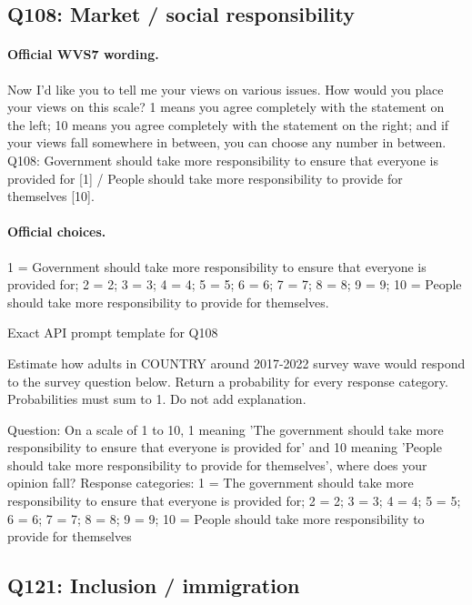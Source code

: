 \subsection{Q108: Market / social responsibility}

\paragraph{Official WVS7 wording.} Now I'd like you to tell me your views on various issues. How would you place your views on this scale? 1 means you agree completely with the statement on the left; 10 means you agree completely with the statement on the right; and if your views fall somewhere in between, you can choose any number in between. Q108: Government should take more responsibility to ensure that everyone is provided for [1] / People should take more responsibility to provide for themselves [10]. \citep[p.~7]{wvs7masterquestionnaire}

\paragraph{Official choices.} 1 = Government should take more responsibility to ensure that everyone is provided for; 2 = 2; 3 = 3; 4 = 4; 5 = 5; 6 = 6; 7 = 7; 8 = 8; 9 = 9; 10 = People should take more responsibility to provide for themselves.

\begin{promptlisting}{Exact API prompt template for Q108}

Estimate how adults in {{COUNTRY}} around 2017-2022 survey wave would respond to the survey question below.
Return a probability for every response category. Probabilities must sum to 1. Do not add explanation.

Question: On a scale of 1 to 10, 1 meaning 'The government should take more responsibility to ensure that everyone is provided for' and 10 meaning 'People should take more responsibility to provide for themselves', where does your opinion fall?
Response categories: 1 = The government should take more responsibility to ensure that everyone is provided for; 2 = 2; 3 = 3; 4 = 4; 5 = 5; 6 = 6; 7 = 7; 8 = 8; 9 = 9; 10 = People should take more responsibility to provide for themselves

\end{promptlisting}

\subsection{Q121: Inclusion / immigration}

